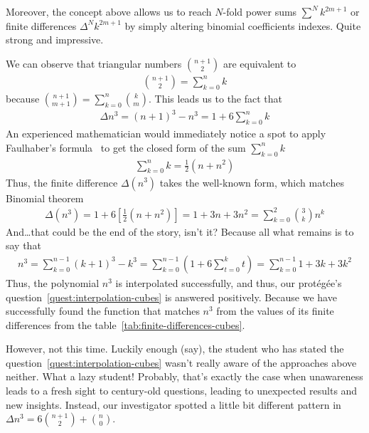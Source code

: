 Moreover, the concept above allows us to reach $N$-fold power sums $\sum^N k^{2m+1}$
or finite differences $\Delta^N k^{2m+1}$ by simply altering
binomial coefficients indexes.
Quite strong and impressive.

We can observe that triangular numbers $\binom{n+1}{2}$ are equivalent to
\begin{align*}
    \binom{n+1}{2} = \sum_{k=0}^{n} k
\end{align*}
because $\binom{n+1}{m+1} = \sum_{k=0}^{n} \binom{k}{m}$.
This leads us to the fact that
\begin{align*}
    \Delta n^3 = (n+1)^3 - n^3 = 1 + 6 \sum_{k=0}^{n} k
\end{align*}
An experienced mathematician would immediately notice a spot to apply Faulhaber's formula~\cite{beardon1996sums}
to get the closed form of the sum $\sum_{k=0}^{n} k$
\begin{align*}
    \sum_{k=0}^{n} k = \frac{1}{2}(n+n^2)
\end{align*}
Thus, the finite difference $\Delta(n^3)$ takes the well-known form,
which matches Binomial theorem~\cite{abramowitz1988handbook}
\begin{align*}
    \Delta(n^3)
    = 1 + 6 \left[ \frac{1}{2}(n+n^2) \right]
    = 1 + 3 n + 3 n^2
    = \sum_{k=0}^{2} \binom{3}{k} n^k
\end{align*}
And\ldots that could be the end of the story, isn't it?
Because all what remains is to say that
\begin{align*}
    n^3
    = \sum_{k=0}^{n-1} (k+1)^3 - k^3
    = \sum_{k=0}^{n-1} \left( 1 + 6 \sum_{t=0}^{k} t \right)
    = \sum_{k=0}^{n-1} 1 + 3 k + 3 k^2
\end{align*}
Thus, the polynomial $n^3$ is interpolated successfully, and thus,
our protégée's question~\eqref{quest:interpolation-cubes} is answered positively.
Because we have successfully found the function that matches $n^3$ from the values of its finite differences from the
table~\eqref{tab:finite-differences-cubes}.

However, not this time.
Luckily enough (say), the student who has stated the question~\eqref{quest:interpolation-cubes}
wasn't really aware of the approaches above neither.
What a lazy student!
Probably, that's exactly the case when unawareness leads to a fresh sight to century-old questions,
leading to unexpected results and new insights.
Instead, our investigator spotted a little bit different pattern in $\Delta n^3= 6 \binom{n+1}{2} + \binom{n}{0}$.

